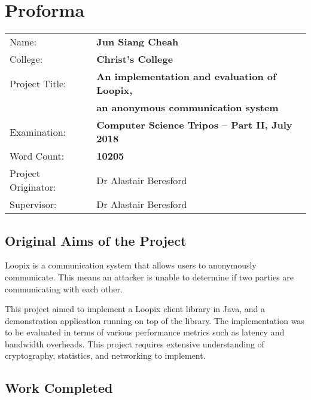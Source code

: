 \documentclass[final,dissertation.tex]{subfiles}
\begin{document}
\pagestyle{plain}

\chapter*{Proforma}

{\large
	\begin{tabular}{ll}
		Name:               & \bf Jun Siang Cheah                               \\
		College:            & \bf Christ's College                              \\
		Project Title:      & \bf An implementation and evaluation of Loopix,   \\ 
		& \bf an anonymous communication system                                 \\
		Examination:        & \bf Computer Science Tripos -- Part II, July 2018 \\
		Word Count:         & \bf 10205\footnotemark                              \\
		Project Originator: & Dr Alastair Beresford                             \\
		Supervisor:         & Dr Alastair Beresford                             \\ 
	\end{tabular}
}


\section*{Original Aims of the Project}


Loopix is a communication system that allows users to anonymously communicate. This means an attacker is unable to determine if two parties are communicating with each other. 

This project aimed to implement a Loopix client library in Java, and a demonstration application running on top of the library. The implementation was to be evaluated in terms of various performance metrics such as latency and bandwidth overheads. This project requires extensive understanding of cryptography, statistics, and networking to implement.

\section*{Work Completed}
\end{document}
